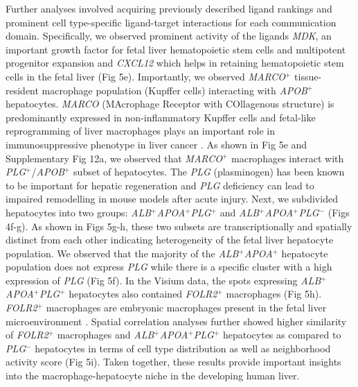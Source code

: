 Further analyses involved acquiring previously described ligand rankings and prominent cell type-specific ligand-target interactions for each communication domain. Specifically, we observed prominent activity of the ligands \textit{MDK}, an important growth factor for fetal liver hematopoietic stem cells and multipotent progenitor expansion \citep{Gao2022} and \textit{CXCL12} which helps in retaining hematopoietic stem cells in the fetal liver \citep{Lewis2021} (Fig 5e). Importantly, we observed \textit{MARCO}$^+$ tissue-resident macrophage population (Kupffer cells) interacting with \textit{APOB}$^+$ hepatocytes. \textit{MARCO} (MAcrophage Receptor with COllagenous structure) is predominantly expressed in non-inflammatory Kupffer cells \citep{MacParland2018} and fetal-like reprogramming of liver macrophages plays an important role in immunosuppressive phenotype in liver cancer \citep{SHARMA2020377}. As shown in Fig 5e and Supplementary Fig 12a, we observed that \textit{MARCO}$^+$ macrophages interact with \textit{PLG}$^+$/\textit{APOB}$^+$ subset of hepatocytes. The \textit{PLG} (plasminogen) has been known to be important for hepatic regeneration \citep{doi:10.1073/pnas.96.26.15143,00001721-200809000-00006} and \textit{PLG} deficiency can lead to impaired remodelling in mouse models after acute injury. Next, we subdivided hepatocytes into two groups: \textit{ALB}$^+$\textit{APOA}$^+$\textit{PLG}$^+$ and \textit{ALB}$^+$\textit{APOA}$^+$\textit{PLG}$^-$ (Figs 4f-g). As shown in Figs 5g-h, these two subsets are transcriptionally and spatially distinct from each other indicating heterogeneity of the fetal liver hepatocyte population. We observed that the majority of the \textit{ALB}$^+$\textit{APOA}$^+$ hepatocyte population does not express \textit{PLG} while there is a specific cluster with a high expression of \textit{PLG} (Fig 5f). In the Visium data, the spots expressing \textit{ALB}$^+$\textit{APOA}$^+$\textit{PLG}$^+$ hepatocytes also contained \textit{FOLR2}$^+$ macrophages (Fig 5h). \textit{FOLR2}$^+$ macrophages are embryonic macrophages present in the fetal liver microenvironment \citep{SHARMA2020377}. Spatial correlation analyses further showed higher similarity of \textit{FOLR2}$^+$ macrophages and \textit{ALB}$^+$\textit{APOA}$^+$\textit{PLG}$^+$ hepatocytes as compared to \textit{PLG}$^-$ hepatocytes in terms of cell type distribution as well as neighborhood activity score (Fig 5i). Taken together, these results provide important insights into the macrophage-hepatocyte niche in the developing human liver. \par

